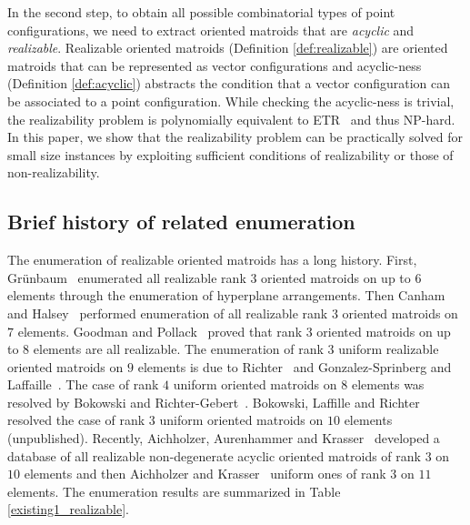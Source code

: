 \documentclass{article}
\begin{document}
In the second step, to obtain all possible combinatorial types of point configurations, 
we need to extract oriented matroids that are {\it acyclic} and {\it realizable}.
Realizable oriented matroids (Definition \ref{def:realizable}) are oriented matroids that can be represented as vector configurations
and acyclic-ness (Definition \ref{def:acyclic}) abstracts the condition that a vector configuration can be associated to a point configuration.
While checking the acyclic-ness is trivial, the realizability problem is polynomially equivalent to ETR~\cite{M88,S91} and thus NP-hard.
In this paper, we show that the realizability problem can be practically
solved for small size instances by exploiting
sufficient conditions of realizability or those of non-realizability.

\subsection{Brief history of related enumeration}
The enumeration of realizable oriented matroids has a long history.
First, Gr\"unbaum~\cite{G03,G72} enumerated all realizable rank $3$ oriented matroids on up to $6$ elements
through the enumeration of hyperplane arrangements.
Then Canham~\cite{C71} and Halsey~\cite{H71} performed enumeration of all realizable rank $3$ oriented matroids on $7$ elements.
Goodman and Pollack~\cite{GP80a,GP80b} proved that rank $3$ oriented matroids on up to $8$ elements are all
realizable.
The enumeration of rank $3$ uniform realizable oriented matroids on $9$ elements is due to Richter~\cite{R88} and Gonzalez-Sprinberg and Laffaille~\cite{GSL89}.
The case of rank $4$ uniform oriented matroids on $8$ elements was resolved by Bokowski and Richter-Gebert~\cite{BRG90}.
Bokowski, Laffille and Richter resolved the case of rank $3$ uniform oriented matroids on $10$ elements (unpublished).
Recently, Aichholzer, Aurenhammer and Krasser~\cite{AAK02} developed a database of all realizable
non-degenerate acyclic oriented matroids of rank $3$ on $10$ elements and then
Aichholzer and Krasser~\cite{AK06} uniform ones of rank $3$ on $11$ elements.
The enumeration results are summarized in Table \ref{existing1_realizable}.
\end{document}
